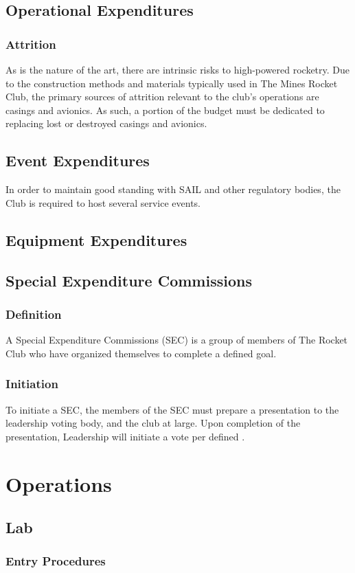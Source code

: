 \documentclass[12pt]{article}
\begin{document}
\subsection{Operational Expenditures}
\subsubsection{Attrition}
As is the nature of the art, there are intrinsic risks to high-powered rocketry.
Due to the construction methods and materials typically used in The Mines Rocket Club,
the primary sources of attrition relevant to the club's operations are casings and avionics.
As such, a portion of the budget must be dedicated to replacing lost or destroyed casings and avionics.
\subsection{Event Expenditures}
In order to maintain good standing with SAIL and other regulatory bodies,
the Club is required to host several service events.
\subsection{Equipment Expenditures}
\subsection{Special Expenditure Commissions}
\subsubsection{Definition}
A Special Expenditure Commissions (SEC) is a group of members of The Rocket Club who have organized themselves to complete a defined goal.
\subsubsection{Initiation}
To initiate a SEC, 
the members of the SEC must prepare a presentation to the leadership voting body, 
and the club at large.
Upon completion of the presentation,
Leadership will initiate a vote per defined .

\section{Operations}
\subsection{Lab}
\subsubsection{Entry Procedures}
\end{document}
